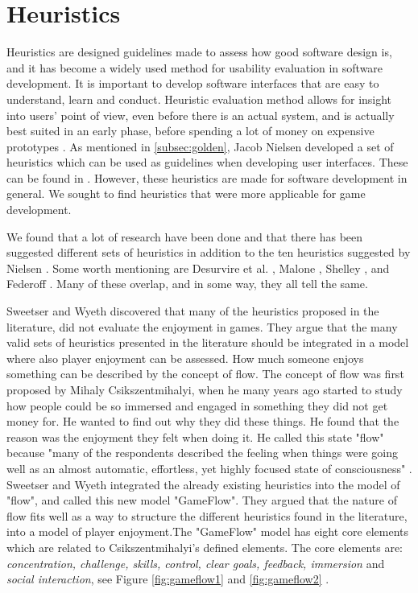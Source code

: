\section{Heuristics}
\label{sec:heur}
Heuristics are designed guidelines made to assess how good software design is, and it has become a widely used method for usability evaluation in software development. It is important to develop software interfaces that are easy to understand, learn and conduct. Heuristic evaluation method allows for insight into users' point of view, even before there is an actual system, and is actually best suited in an early phase, before spending a lot of money on expensive prototypes \cite{desurvire}. As mentioned in \ref{subsec:golden}, Jacob Nielsen developed a set of heuristics which can be used as guidelines when developing user interfaces. These can be found in \cite{nielsen2005ten}. However, these heuristics are made for software development in general. We sought to find heuristics that were more applicable for game development. 

We found that a lot of research have been done and that there has been suggested different sets of heuristics in addition to the ten heuristics suggested by Nielsen \cite{nielsen2005ten}. Some worth mentioning are Desurvire et al. \cite{desurvire}, Malone \cite{malone}, Shelley \cite{shelley}, and Federoff \cite{federoff}. Many of these overlap, and in some way, they all tell the same. 

Sweetser and Wyeth discovered that many of the heuristics proposed in the literature, did not evaluate the enjoyment in games. They argue that the many valid sets of heuristics presented in the literature should be integrated in a model where also player enjoyment can be assessed. How much someone enjoys something can be described by the concept of flow. The concept of flow was first proposed by  Mihaly Csikszentmihalyi, when he many years ago started  to study how people could be so immersed and engaged in something they did not get money for. He wanted to find out why they did these things. He found that the reason was the enjoyment they felt when doing it. He called this state "flow" because "many of the respondents described the feeling when things were going well as an almost automatic, effortless, yet highly focused state of consciousness" \cite{flow}.  Sweetser and Wyeth integrated the already existing heuristics into the model of "flow", and called this new model "GameFlow".  They argued that the nature of flow fits well as a way to structure the different heuristics found in the literature, into a model of player enjoyment.The "GameFlow" model has eight core elements which are related to Csikszentmihalyi's defined elements. The core elements are: \emph{concentration, challenge, skills, control, clear goals, feedback, immersion} and \emph{social interaction}, see Figure \ref{fig:gameflow1} and \ref{fig:gameflow2} \cite{sweetser}. 


